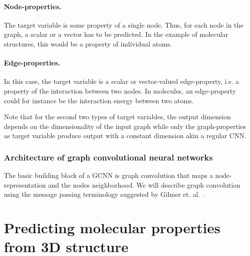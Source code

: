 \paragraph{Node-properties.}
The target variable is some property of a single node. Thus, for each node in the graph, a scalar or a vector has to be predicted. In the example of molecular structures, this would be a property of individual atoms.
\paragraph{Edge-properties.}
In this case, the target variable is a scalar or vector-valued edge-property, i.e. a property of the interaction between two nodes. In molecules, an edge-property could for instance be the interaction energy between two atoms.

Note that for the second two types of target variables, the output dimension depends on the dimensionality of the input graph while only the graph-properties as target variable produce output with a constant dimension akin a regular CNN.

\subsubsection{Architecture of graph convolutional neural networks}


The basic building block of a GCNN is graph convolution that maps a node-representation and the nodes neighborhood. We will describe graph convolution using the message passing terminology suggested by Gilmer et. al.~\cite{Gilmer2017}.





%
%


\section{Predicting molecular properties from 3D structure}

